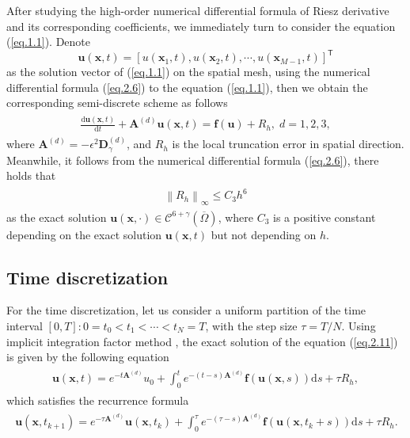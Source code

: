 \documentclass{siamart171218}
\numberwithin{theorem}{section}
\numberwithin{equation}{section}
\newcommand{\vecx}{\boldsymbol{x}}
\begin{document}
After studying the high-order numerical differential formula of Riesz derivative and its
 corresponding coefficients, we immediately turn to consider the equation (\ref{eq.1.1}).
Denote $$\mathbf{u}(\vecx,t)=\left[u(\vecx_1,t),u(\vecx_2,t),
\cdots,u(\vecx_{M-1},t)\right]^{\mathsf{T}}$$ as
the solution vector of (\ref{eq.1.1}) on the spatial mesh, using the numerical differential
 formula (\ref{eq.2.6})
to the equation (\ref{eq.1.1}), then we
obtain the corresponding semi-discrete scheme as follows
\begin{eqnarray}\label{eq.2.11}
\begin{array}{lll}\displaystyle
\frac{\mathrm{d}\mathbf{u}(\vecx,t)}{\mathrm{d}t}+\mathbf{A}^{(d)}\mathbf{u}(\vecx,t)
=\mathbf{f}\left(\mathbf{u}\right)+R_h,\;d=1,2,3,
\end{array}
\end{eqnarray}
where $\mathbf{A}^{(d)}=-\epsilon^2\mathbf{D}_\gamma^{(d)}$, and
$R_h$ is the local truncation error in spatial direction.
Meanwhile,
it follows from the numerical differential
 formula (\ref{eq.2.6}), there holds that
\begin{eqnarray}\label{eq.2.12}
\begin{array}{lll}\displaystyle
\left\|R_h\right\|_\infty\leq C_3h^6
\end{array}
\end{eqnarray}
as the exact solution $\mathbf{u}(\vecx,\cdot)\in\mathscr{C}^{6+\gamma}
\left(\overline{\Omega}\right)$,
where $C_3$ is a positive constant depending on the exact
 solution $\mathbf{u}(\vecx,t)$
but not depending on $h$.

\subsection{Time discretization}
For the time discretization, let us consider a uniform partition of the time interval
$[0, T ] : 0 = t_0 < t_1 <\cdots < t_N = T $, with the step size $\tau= T/N$.
Using implicit integration factor method \cite{Nie2008}, the exact solution of the
 equation (\ref{eq.2.11})
is given by the following equation
\begin{eqnarray*}
\begin{array}{lll}\displaystyle
\mathbf{u}\left(\vecx,t\right)=e^{-t\mathbf{A}^{(d)}}u_0+\int_{0}^{t}
e^{-(t-s)\mathbf{A}^{(d)}}\mathbf{f}\left(\mathbf{u}\left(\vecx,s\right)\right)\mathrm{d}s
+\tau R_h,
\end{array}
\end{eqnarray*}
which satisfies the recurrence formula
\begin{eqnarray}\label{eq.2.13}
\begin{array}{lll}\displaystyle
\mathbf{u}\left(\vecx,t_{k+1}\right)=e^{-\tau \mathbf{A}^{(d)}}\mathbf{u}
\left(\vecx,t_{k}\right)+\int_{0}^{\tau}
e^{-(\tau-s)\mathbf{A}^{(d)}}\mathbf{f}\left(\mathbf{u}
\left(\vecx,t_{k}+s\right)\right)\mathrm{d}s+
\tau R_h.
\end{array}
\end{eqnarray}
\end{document}
